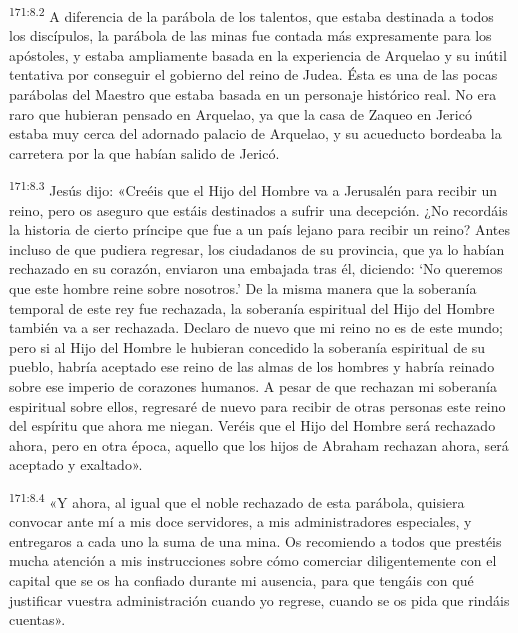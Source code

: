 \par 
\textsuperscript{171:8.2} A diferencia de la parábola de los talentos, que estaba destinada a todos los discípulos, la parábola de las minas fue contada más expresamente para los apóstoles, y estaba ampliamente basada en la experiencia de Arquelao y su inútil tentativa por conseguir el gobierno del reino de Judea. Ésta es una de las pocas parábolas del Maestro que estaba basada en un personaje histórico real. No era raro que hubieran pensado en Arquelao, ya que la casa de Zaqueo en Jericó estaba muy cerca del adornado palacio de Arquelao, y su acueducto bordeaba la carretera por la que habían salido de Jericó.

\par 
\textsuperscript{171:8.3} Jesús dijo: «Creéis que el Hijo del Hombre va a Jerusalén para recibir un reino, pero os aseguro que estáis destinados a sufrir una decepción. ¿No recordáis la historia de cierto príncipe que fue a un país lejano para recibir un reino? Antes incluso de que pudiera regresar, los ciudadanos de su provincia, que ya lo habían rechazado en su corazón, enviaron una embajada tras él, diciendo: `No queremos que este hombre reine sobre nosotros.' De la misma manera que la soberanía temporal de este rey fue rechazada, la soberanía espiritual del Hijo del Hombre también va a ser rechazada. Declaro de nuevo que mi reino no es de este mundo; pero si al Hijo del Hombre le hubieran concedido la soberanía espiritual de su pueblo, habría aceptado ese reino de las almas de los hombres y habría reinado sobre ese imperio de corazones humanos. A pesar de que rechazan mi soberanía espiritual sobre ellos, regresaré de nuevo para recibir de otras personas este reino del espíritu que ahora me niegan. Veréis que el Hijo del Hombre será rechazado ahora, pero en otra época, aquello que los hijos de Abraham rechazan ahora, será aceptado y exaltado».

\par 
\textsuperscript{171:8.4} «Y ahora, al igual que el noble rechazado de esta parábola, quisiera convocar ante mí a mis doce servidores, a mis administradores especiales, y entregaros a cada uno la suma de una mina. Os recomiendo a todos que prestéis mucha atención a mis instrucciones sobre cómo comerciar diligentemente con el capital que se os ha confiado durante mi ausencia, para que tengáis con qué justificar vuestra administración cuando yo regrese, cuando se os pida que rindáis cuentas».

